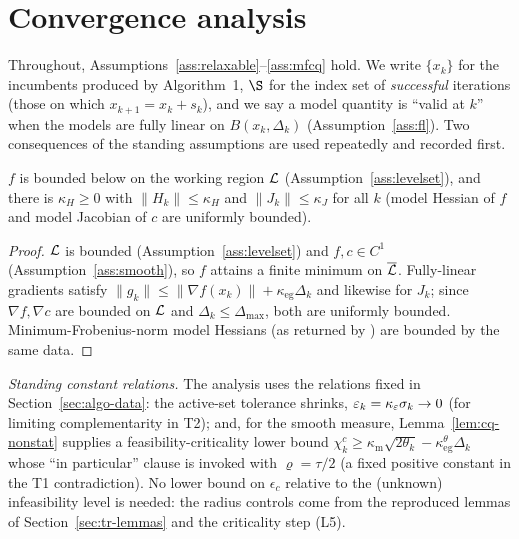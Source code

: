 \section{Convergence analysis}
\label{sec:convergence}

Throughout, Assumptions~\ref{ass:relaxable}--\ref{ass:mfcq} hold. We write
$\{x_k\}$ for the incumbents produced by Algorithm~1, $\S$ for the index set of
\emph{successful} iterations (those on which $x_{k+1}=x_k+s_k$), and we say a model
quantity is ``valid at $k$'' when the models are fully linear on $B(x_k,\Delta_k)$
(Assumption~\ref{ass:fl}). Two consequences of the standing assumptions are used
repeatedly and recorded first.

\begin{proposition}[Boundedness]
  \label{prop:bounded}
  $f$ is bounded below on the working region $\mathcal{L}$
  (Assumption~\ref{ass:levelset}), and there is $\kappa_H\ge0$ with
  $\|H_k\|\le\kappa_H$ and $\|J_k\|\le\kappa_J$ for all $k$ (model Hessian of $f$
  and model Jacobian of $c$ are uniformly bounded).
\end{proposition}
\begin{proof}
  $\mathcal{L}$ is bounded (Assumption~\ref{ass:levelset}) and $f,c\in C^1$
  (Assumption~\ref{ass:smooth}), so $f$ attains a finite minimum on $\overline{\mathcal{L}}$.
  Fully-linear gradients satisfy $\|g_k\|\le\|\nabla f(x_k)\|+\kappa_{\mathrm{eg}}\Delta_k$
  and likewise for $J_k$; since $\nabla f,\nabla c$ are bounded on $\mathcal{L}$ and
  $\Delta_k\le\Delta_{\max}$, both are uniformly bounded. Minimum-Frobenius-norm
  model Hessians (as returned by ) are bounded by the same data.
\end{proof}

\noindent\emph{Standing constant relations.} The analysis uses the relations fixed
in Section~\ref{sec:algo-data}: the active-set tolerance shrinks,
$\varepsilon_k=\kappa_{\varepsilon}\sigma_k\to0$ (for limiting complementarity in T2); and,
for the smooth measure, Lemma~\ref{lem:cq-nonstat} supplies a feasibility-criticality
lower bound $\chi_k^c\ge\kappa_{\mathrm m}\sqrt{2\theta_k}-\kappa_{\mathrm{eg}}^\theta\Delta_k$
whose ``in particular'' clause is invoked with $\varrho=\tau/2$ (a fixed positive
constant in the T1 contradiction). No lower bound on $\epsilon_c$ relative to the
(unknown) infeasibility level is needed: the radius controls come from the reproduced
lemmas of Section~\ref{sec:tr-lemmas} and the criticality step (L5).

